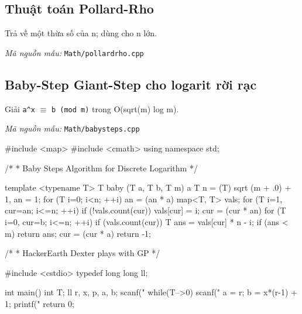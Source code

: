 \documentclass[11pt]{article}
\newcommand{\codepath}[1]{\par\noindent\textit{Mã nguồn mẫu:} \texttt{#1}\par}
\begin{document}
\subsection{Thuật toán Pollard-Rho}

Trả về một thừa số của n; dùng cho n lớn.

\codepath{Math/pollardrho.cpp}

\begingroup\scriptsize
{}
\endgroup


\subsection{Baby-Step Giant-Step cho logarit rời rạc}

Giải \texttt{a\textasciicircum{}x} \(\equiv\) \texttt{b (mod m)} trong O(sqrt(m) log m).

\codepath{Math/babysteps.cpp}

\begingroup\scriptsize
\begin{vncode}
#include <map>
#include <cmath>
using namespace std;

/*
 * Baby Steps Algorithm for Discrete Logarithm
 */

template <typename T>
T baby (T a, T b, T m) {
	a %
	T n = (T) sqrt (m + .0) + 1, an = 1;
	for (T i=0; i<n; ++i) an = (an * a) %
	map<T, T> vals;
	for (T i=1, cur=an; i<=n; ++i) {
		if (!vals.count(cur)) vals[cur] = i;
		cur = (cur * an) %
	}
	for (T i=0, cur=b; i<=n; ++i) {
		if (vals.count(cur)) {
			T ans = vals[cur] * n - i;
			if (ans < m) return ans;
		}
		cur = (cur * a) %
	}
	return -1;
}

/*
 * HackerEarth Dexter plays with GP
 */

#include <cstdio>
typedef long long ll;

int main() {
	int T;
	ll r, x, p, a, b;
	scanf("%
	while(T-->0) {
		scanf("%
		a = r;
		b = x*(r-1) + 1;
		printf("%
	}
	return 0;
}
\end{vncode}
\endgroup
\end{document}
